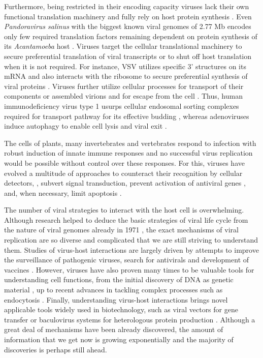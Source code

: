 	Furthermore, being restricted in their encoding capacity viruses lack their own functional translation machinery and fully rely on host protein synthesis \parencite{Walsh2011}. Even \textit{Pandoravirus salinus} with the biggest known viral genomes of 2.77 \gls{Mb} encodes only few required translation factors remaining dependent on protein synthesis of its \textit{Acantamoeba} host \parencite{Philippe2013}. Viruses target the cellular translational machinery to secure preferential translation of viral transcripts or to shut off host translation when it is not required. For instance, \gls{VSV} utilizes specific 3' structures on its mRNA and also interacts with the ribosome to secure preferential synthesis of viral proteins \parencite{Whitlow2006, Lee2013}. Viruses further utilize cellular processes for transport of their components or assembled virions and for escape from the cell \parencite{Bartenschlager2011, Lyles2013}. Thus, human immunodeficiency virus type 1 usurps cellular endosomal sorting complexes required for transport pathway for its effective budding \parencite{Morita2011}, whereas adenoviruses induce autophagy to enable cell lysis and viral exit \parencite{Jiang2011}.
	
	The cells of plants, many invertebrates and vertebrates respond to infection with robust induction of innate immune responses and no successful virus replication would be possible without control over these responses. For this, viruses have evolved a multitude of approaches to counteract their recognition by cellular detectors, \parencite{Zinzula2013}, subvert signal transduction, prevent activation of antiviral genes \parencite{Short2009}, and, when necessary, limit apoptosis \parencite{Galluzzi2008}.
	
	The number of viral strategies to interact with the host cell is overwhelming. Although research helped to deduce the basic strategies of viral life cycle from the nature of viral genomes already in 1971 \parencite{Baltimore1971}, the exact mechanisms of viral replication are so diverse and complicated that we are still striving to understand them. Studies of virus-host interactions are largely driven by attempts to improve the surveillance of pathogenic viruses, search for antivirals and development of vaccines \parencite{Webby2003, Schwegmann2008}. However, viruses have also proven many times to be valuable tools for understanding cell functions, from the initial discovery of DNA as genetic material \parencite{Hershey1952}, up to recent advances in tackling complex processes such as endocytosis \parencite{Pelkmans2003}. Finally, understanding virus-host interactions brings novel applicable tools widely used in biotechnology, such as viral vectors for gene transfer \parencite{Vannucci2013} or baculovirus systems for heterologous protein production \parencite{VanOers2011}. Although a great deal of mechanisms have been already discovered, the amount of information that we get now is growing exponentially and the majority of discoveries is perhaps still ahead. 
		
